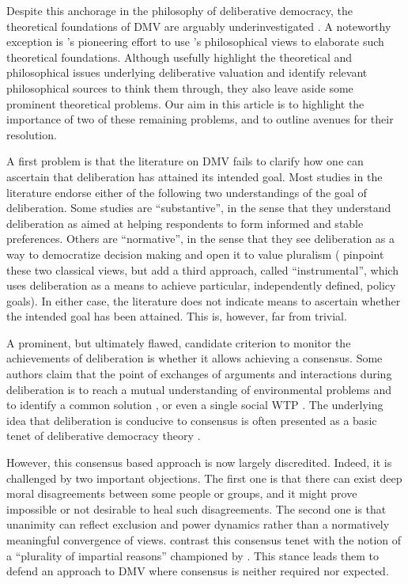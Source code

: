 \documentclass[version=3.21, pagesize, twoside=off, bibliography=totoc, DIV=calc, fontsize=12pt, a4paper, french, english]{scrartcl}
\begin{document}
Despite this anchorage in the philosophy of deliberative democracy, the theoretical foundations of \ac{DMV} are arguably underinvestigated \citep{bartkowski_economic_2017,bartkowski_beyond_2018,bunse_what_2015,kenter_what_2015}. 
A noteworthy exception is \citet{bartkowski_beyond_2018}’s pioneering effort to use \citet{sen_idea_2009}’s philosophical views to elaborate such theoretical foundations. 
Although \citet{bartkowski_beyond_2018} usefully highlight the theoretical and philosophical issues underlying deliberative valuation and identify relevant philosophical sources to think them through, they also leave aside some prominent theoretical problems. 
Our aim in this article is to highlight the importance of two of these remaining problems, and to outline avenues for their resolution.

A first problem is that the literature on \ac{DMV} fails to clarify how one can ascertain that deliberation has attained its intended goal. Most studies in the literature endorse either of the following two understandings of the goal of deliberation. Some studies are “substantive”, in the sense that they understand deliberation as aimed at helping respondents to form informed and stable preferences. Others are “normative”, in the sense that they see deliberation as a way to democratize decision making and open it to value pluralism (\cite{schaafsma_guidance_2018} pinpoint these two classical views, but add a third approach, called “instrumental”, which uses deliberation as a means to achieve particular, independently defined, policy goals). In either case, the literature does not indicate means to ascertain whether the intended goal has been attained. This is, however, far from trivial.

A prominent, but ultimately flawed, candidate criterion to monitor the achievements of deliberation is whether it allows achieving a consensus. Some authors claim that the point of exchanges of arguments and interactions during deliberation is to reach a mutual understanding of environmental problems and to identify a common solution \citep{vatn_institutional_2009}, or even a single social \ac{WTP} \citep{orchard-webb_deliberative_2016}. The underlying idea that deliberation is conducive to consensus is often presented as a basic tenet of deliberative democracy theory \citep{wilson_discourse-based_2002}. 

However, this consensus based approach is now largely discredited. Indeed, it is challenged by two important objections.
The first one is that there can exist deep moral disagreements \citep{dryzek_deliberative_2013} between some people or groups, and it might prove impossible or not desirable to heal such disagreements.
The second one is that unanimity can reflect exclusion and power dynamics \citep{elster_sour_1983,volker_exploring_2016,vargas_background_2016,vargas_problem_2017,murphy_comparing_2017} rather than a normatively meaningful convergence of views.
\citeauthor{bartkowski_beyond_2018} contrast this consensus tenet with the notion of a “plurality of impartial reasons” championed by \citet{sen_idea_2009}.
This stance leads them to defend an approach to \ac{DMV} where consensus is neither required nor expected.
\end{document}
